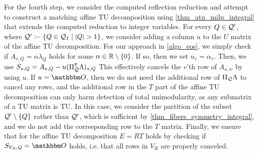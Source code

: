 \documentclass[pdflatex,sn-mathphys-num]{sn-jnl}%
\theoremstyle{thmstyleone}%
\theoremstyle{thmstylethree}%
\theoremstyle{thmstyletwo}%
\begin{document}
For the fourth step, we consider the computed reflection reduction and attempt to construct a matching affine TU decomposition using \cref{thm_atu_milp_integral} that extends the computed reduction to integer variables. 
For every  $Q \in \mathcal{Q}'$, where $\MQ' \coloneq \{ Q \in \MQ_I \mid |Q| > 1 \}$, we consider adding a column $u$ to the $U$ matrix of the affine TU decomposition. For our approach in \cref{algo_eos}, we simply check if $A_{v,Q} =  \alpha \lambda_{Q}$ holds for some $\alpha \in \mathbb{R}\setminus \{0\}$. If so, then we set $u_v = \alpha_v$. Then, we use $S_{\star,Q} = A_{\star,Q} - u (\Pi_{\mathcal{Q}}^{\intercal} \Lambda)_{\star,Q}$ This effectively cancels the $v$'th row of $A_{\star,w}$ by using $u$. If $u = \zerovec$, then we do not need the additional row of $\Pi_{\mathcal{Q}} \Lambda$ to cancel any rows, and the additional row in the $T$ part of the affine TU decomposition can only harm detection of total unimodularity, as any submatrix of a TU matrix is TU. In this case, we consider the partition of the subset $\mathcal{Q}' \setminus \{Q\}$ rather than $\mathcal{Q}'$, which is sufficient by \cref{thm_fibers_symmetry_integral}, and we do not add the corresponding row to the $T$ matrix.
Finally, we ensure that for the affine TU decomposition $E=R T$ holds by checking if $S_{V_R,Q} = \zerovec$ holds, i.e. that all rows in $V_R$ are properly canceled. \\
\end{document}
